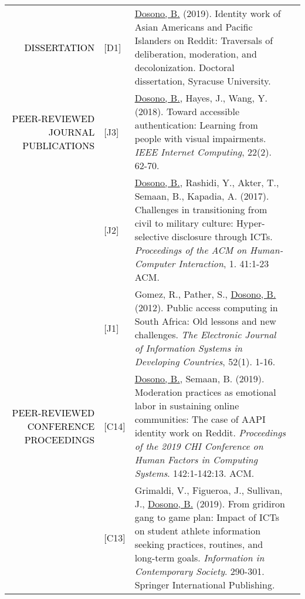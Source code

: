 \documentclass[12pt]{article}
\begin{document}
{{\begin{longtable}{Rp{1.0in}p{0.25in}p{4.75in}}
\textcolor{black}{\footnotesize{\uppercase{Dissertation}}} & \footnotesize{[D1]} &  \href{https://search.proquest.com/openview/5b6ca6c5de28e6c7c3bf213988fcc8cf/}{{Dosono, B.}} (2019). Identity work of Asian Americans and Pacific Islanders on Reddit: Traversals of deliberation, moderation, and decolonization. Doctoral dissertation, Syracuse University. \\

\textcolor{black}{\footnotesize{\uppercase{Peer-reviewed Journal Publications}}} & \footnotesize{[J3]} & \href{https://doi.org/10.1109/MIC.2018.112101619}{{Dosono, B.}}, Hayes, J., Wang, Y. (2018). Toward accessible authentication: Learning from people with visual impairments. \textit{IEEE Internet Computing}, 22(2). 62-70. \\

& \footnotesize{[J2]} & \href{https://dl.acm.org/authorize?N42807}{{Dosono, B.}}, Rashidi, Y., Akter, T., Semaan, B., Kapadia, A. (2017). Challenges in transitioning from civil to military culture: Hyper-selective disclosure through ICTs. \textit{Proceedings of the ACM on Human-Computer Interaction}, 1. 41:1-23 ACM. \\

& \footnotesize{[J1]} & Gomez, R., Pather, S., \href{https://doi.org/10.1002/j.1681-4835.2012.tb00366.x}{{Dosono, B.}} (2012). Public access computing in South Africa: Old lessons and new challenges. \textit{The Electronic Journal of Information Systems in Developing Countries}, 52(1). 1-16. \\

\textcolor{black}{\footnotesize{\uppercase{Peer-reviewed Conference Proceedings}}} 

& \footnotesize{[C14]} & \href{https://dl.acm.org/authorize?N680367}{{Dosono, B.}}, Semaan, B. (2019). Moderation practices as emotional labor in sustaining online communities: The case of AAPI identity work on Reddit. \textit{Proceedings of the 2019 CHI Conference on Human Factors in Computing Systems}. 142:1-142:13. ACM. \\

& \footnotesize{[C13]} & Grimaldi, V., Figueroa, J., Sullivan, J., \href{https://doi.org/10.1007/978-3-030-15742-5_29}{{Dosono, B.}} (2019). From gridiron gang to game plan: Impact of ICTs on student athlete information seeking practices, routines, and long-term goals. \textit{Information in Contemporary Society}. 290-301. Springer International Publishing. \\


\end{longtable}}}
\end{document}
